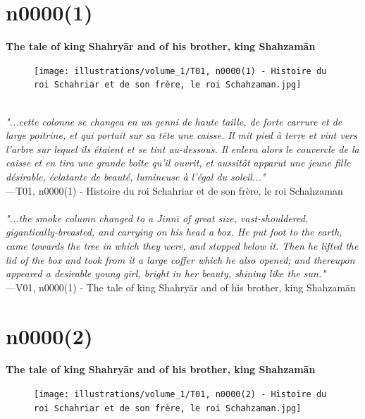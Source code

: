 \documentclass[../Carre_nights.tex]{subfiles}
\begin{document}
\section{n0000(1)}
\textbf{\Large{The tale of king Shahry\=ar and of his brother, king Shahzam\=an}} \\

\begin{figure}[ht]
\centering
\texttt{[image: illustrations/volume\_1/T01, n0000(1) - Histoire du roi Schahriar et de son frère, le roi Schahzaman.jpg]}
\end{figure}

\textit{\\
"...cette colonne se changea en un genni de haute taille, de forte carrure et de large poitrine, et qui portait sur sa tête une caisse. Il mit pied à terre et vint vers l’arbre sur lequel ils étaient et se tint au-dessous. Il enleva alors le couvercle de la caisse et en tira une grande boîte qu’il ouvrit, et aussitôt apparut une jeune fille désirable, éclatante de beauté, lumineuse à l’égal du soleil..."} \\
—T01, n0000(1) - Histoire du roi Schahriar et de son frère, le roi Schahzaman \\~\\
\textit{"...the smoke column changed to a Jinn\={\i} of great size, vast-shouldered, gigantically-breasted, and carrying on his head a box. He put foot to the earth, came towards the tree in which they were, and stopped below it. Then he lifted the lid of the box and took from it a large coffer which he also opened; and thereupon appeared a desirable young girl, bright in her beauty, shining like the sun."} \\
—V01, n0000(1) - The tale of king Shahry\=ar and of his brother, king Shahzam\=an

\newpage

\section{n0000(2)}
\textbf{\Large{The tale of king Shahry\=ar and of his brother, king Shahzam\=an}} \\

\begin{figure}[ht]
\centering
\texttt{[image: illustrations/volume\_1/T01, n0000(2) - Histoire du roi Schahriar et de son frère, le roi Schahzaman.jpg]}
\end{figure}
\end{document}
